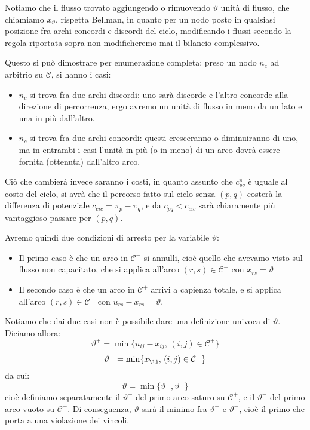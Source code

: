 \documentclass[a4paper,11pt]{article}
\begin{document}
Notiamo che il flusso trovato aggiungendo o rimuovendo $\vartheta$ unità di flusso, che chiamiamo $x_\vartheta$, rispetta Bellman, in quanto per un nodo posto in qualsiasi posizione fra archi concordi e discordi del ciclo, modificando i flussi secondo la regola riportata sopra non modificheremo mai il bilancio complessivo.

Questo si può dimostrare per enumerazione completa: preso un nodo $n_c$ ad arbitrio su $\mathcal{C}$, si hanno i casi:
\begin{itemize}
	\item $n_c$ si trova fra due archi discordi: uno sarà discorde e l'altro concorde alla direzione di percorrenza, ergo avremo un unità di flusso in meno da un lato e una in più dall'altro.
	\item $n_c$ si trova fra due archi concordi: questi cresceranno o diminuiranno di uno, ma in entrambi i casi l'unità in più (o in meno) di un arco dovrà essere fornita (ottenuta) dall'altro arco.
\end{itemize}

Ciò che cambierà invece saranno i costi, in quanto assunto che $c_{pq}^\pi$ è uguale al costo del ciclo, si avrà che il percorso fatto sul ciclo senza $(p,q)$ costerà la differenza di potenziale $c_{cic} = \pi_{p} - \pi_{q}$, e da $c_{pq} < c_{cic}$ sarà chiaramente più vantaggioso passare per $(p,q)$.

Avremo quindi due condizioni di arresto per la variabile $\vartheta$:
\begin{itemize}
	\item Il primo caso è che un arco in $\mathcal{C}^-$ si annulli, cioè quello che avevamo visto sul flusso non capacitato, che si applica all'arco $(r,s) \in \mathcal{C}^-$ con $x_{rs} = \vartheta$
	\item Il secondo caso è che un arco in $\mathcal{C}^+$ arrivi a capienza totale, e si applica all'arco $(r,s) \in \mathcal{C}^-$ con $u_{rs} - x_{rs} = \vartheta$.
\end{itemize}

Notiamo che dai due casi non è possibile dare una definizione univoca di $\vartheta$. Diciamo allora:
$$
\vartheta^+ = \min\{ u_{ij} - x_{ij}, \, (i, j) \in \mathcal{C}^+ \}
$$
$$
\vartheta^- = \min\{ x_{\ij}, \, (i, j) \in \mathcal{C}^- \}
$$
da cui:
$$
\vartheta = \min\{\vartheta^+, \vartheta^-\}
$$
cioè definiamo separatamente il $\vartheta^+$ del primo arco saturo su $\mathcal{C}^+$, e il $\vartheta^-$ del primo arco vuoto su $\mathcal{C}^-$.
Di conseguenza, $\vartheta$ sarà il minimo fra $\vartheta^+$ e $\vartheta^-$, cioè il primo che porta a una violazione dei vincoli.
\end{document}
